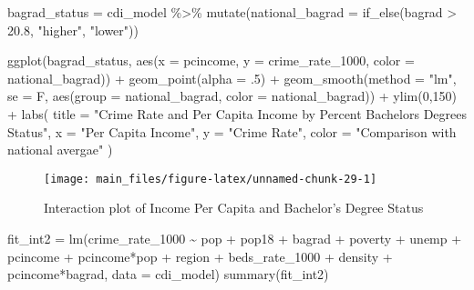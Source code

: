 \documentclass[
  11pt,
]{article}
\newenvironment{Shaded}{\begin{snugshade}}{\end{snugshade}}
\newcommand{\AttributeTok}[1]{\textcolor[rgb]{0.77,0.63,0.00}{#1}}
\newcommand{\DecValTok}[1]{\textcolor[rgb]{0.00,0.00,0.81}{#1}}
\newcommand{\FloatTok}[1]{\textcolor[rgb]{0.00,0.00,0.81}{#1}}
\newcommand{\FunctionTok}[1]{\textcolor[rgb]{0.00,0.00,0.00}{#1}}
\newcommand{\NormalTok}[1]{#1}
\newcommand{\OtherTok}[1]{\textcolor[rgb]{0.56,0.35,0.01}{#1}}
\newcommand{\SpecialCharTok}[1]{\textcolor[rgb]{0.00,0.00,0.00}{#1}}
\newcommand{\StringTok}[1]{\textcolor[rgb]{0.31,0.60,0.02}{#1}}
\begin{document}
\begin{Shaded}
\begin{Highlighting}[]
\NormalTok{bagrad\_status }\OtherTok{=}\NormalTok{ cdi\_model }\SpecialCharTok{\%\textgreater{}\%} 
  \FunctionTok{mutate}\NormalTok{(}\AttributeTok{national\_bagrad =} \FunctionTok{if\_else}\NormalTok{(bagrad }\SpecialCharTok{\textgreater{}} \FloatTok{20.8}\NormalTok{, }\StringTok{"higher"}\NormalTok{, }\StringTok{"lower"}\NormalTok{))}

\FunctionTok{ggplot}\NormalTok{(bagrad\_status, }\FunctionTok{aes}\NormalTok{(}\AttributeTok{x =}\NormalTok{ pcincome, }\AttributeTok{y =}\NormalTok{ crime\_rate\_1000, }\AttributeTok{color =}\NormalTok{ national\_bagrad)) }\SpecialCharTok{+} 
  \FunctionTok{geom\_point}\NormalTok{(}\AttributeTok{alpha =}\NormalTok{ .}\DecValTok{5}\NormalTok{) }\SpecialCharTok{+}
  \FunctionTok{geom\_smooth}\NormalTok{(}\AttributeTok{method =} \StringTok{"lm"}\NormalTok{, }\AttributeTok{se =}\NormalTok{ F, }\FunctionTok{aes}\NormalTok{(}\AttributeTok{group =}\NormalTok{ national\_bagrad, }\AttributeTok{color =}\NormalTok{ national\_bagrad)) }\SpecialCharTok{+}
  \FunctionTok{ylim}\NormalTok{(}\DecValTok{0}\NormalTok{,}\DecValTok{150}\NormalTok{) }\SpecialCharTok{+}
  \FunctionTok{labs}\NormalTok{(}
    \AttributeTok{title =} \StringTok{"Crime Rate and Per Capita Income by Percent Bachelor\textquotesingle{}s Degrees Status"}\NormalTok{,}
    \AttributeTok{x =} \StringTok{"Per Capita Income"}\NormalTok{,}
    \AttributeTok{y =} \StringTok{"Crime Rate"}\NormalTok{,}
    \AttributeTok{color =} \StringTok{"Comparison with national avergae"}
\NormalTok{  )}
\end{Highlighting}
\end{Shaded}

\begin{figure}
\texttt{[image: main\_files/figure-latex/unnamed-chunk-29-1]} \caption{\label{fig:figs}Interaction plot of Income Per Capita and Bachelor's Degree Status}\label{fig:unnamed-chunk-29}
\end{figure}

\begin{Shaded}
\begin{Highlighting}[]
\NormalTok{fit\_int2 }\OtherTok{=} \FunctionTok{lm}\NormalTok{(crime\_rate\_1000 }\SpecialCharTok{\textasciitilde{}}  
\NormalTok{                  pop }\SpecialCharTok{+}\NormalTok{ pop18 }\SpecialCharTok{+}\NormalTok{ bagrad }\SpecialCharTok{+}
\NormalTok{                  poverty }\SpecialCharTok{+}\NormalTok{ unemp }\SpecialCharTok{+}\NormalTok{ pcincome }\SpecialCharTok{+}\NormalTok{ pcincome}\SpecialCharTok{*}\NormalTok{pop }\SpecialCharTok{+}\NormalTok{ region }\SpecialCharTok{+}
\NormalTok{                  beds\_rate\_1000 }\SpecialCharTok{+}\NormalTok{ density }\SpecialCharTok{+}
\NormalTok{                  pcincome}\SpecialCharTok{*}\NormalTok{bagrad, }\AttributeTok{data =}\NormalTok{ cdi\_model)}
\FunctionTok{summary}\NormalTok{(fit\_int2)}
\end{Highlighting}
\end{Shaded}
\end{document}
